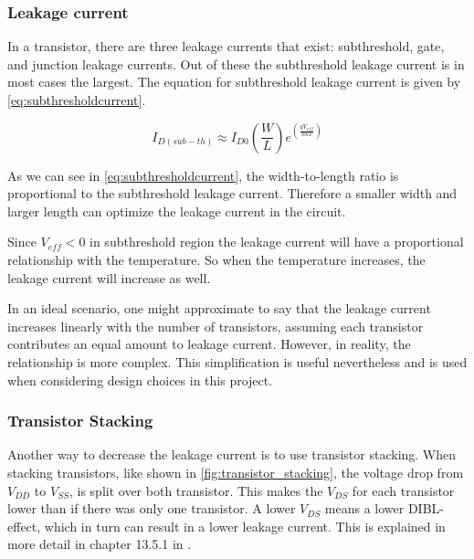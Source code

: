 \subsubsection{Leakage current}

In a transistor, there are three leakage currents that exist: subthreshold, gate, and
junction leakage currents. Out of these the subthreshold leakage current is in most cases the largest.\cite[p.49]{Analog_integrated} The equation for subthreshold leakage current is given by \autoref{eq:subthresholdcurrent}.\cite[p.42]{Analog_integrated}

\begin{equation}
    \label{eq:subthresholdcurrent}
    I_{D(sub-th)} \approx I_{D0}\left(\frac{W}{L}\right)e^{\left(\frac{qV_{eff}}{nkT}\right)}
\end{equation}

As we can see in \autoref{eq:subthresholdcurrent}, the width-to-length ratio is proportional to the subthreshold leakage current. Therefore a smaller width and larger length can optimize the leakage current in the circuit.

Since $V_{eff} < 0$ in subthreshold region the leakage current will have a proportional relationship with the temperature. So when the temperature increases, the leakage current will increase as well. 

In an ideal scenario, one might approximate to say that the leakage current increases linearly with the number of transistors, assuming each transistor contributes an equal amount to leakage current. However, in reality, the relationship is more complex. This simplification is useful nevertheless and is used when considering design choices in this project.

\subsubsection{Transistor Stacking}
Another way to decrease the leakage current is to use transistor stacking. When stacking transistors, like shown in \autoref{fig:transistor_stacking}, the voltage drop from $V_{DD}$ to $V_{SS}$, is split over both transistor. This makes the $V_{DS}$ for each transistor lower than if there was only one transistor. A lower $V_{DS}$ means a lower DIBL-effect, which in turn can result in a lower leakage current. This is explained in more detail in chapter 13.5.1 in \cite{transistor_stacking}.

